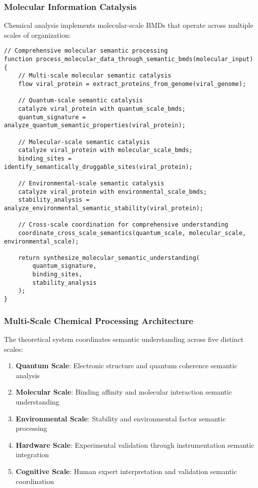 \documentclass[12pt,a4paper,twoside]{article}
\begin{document}
\subsubsection{Molecular Information Catalysis}

Chemical analysis implements molecular-scale BMDs that operate across multiple scales of organization:

\begin{lstlisting}[caption=Theoretical Cheminformatics BMD Operations]
// Comprehensive molecular semantic processing
function process_molecular_data_through_semantic_bmds(molecular_input) {
    // Multi-scale molecular semantic catalysis
    flow viral_protein = extract_proteins_from_genome(viral_genome);

    // Quantum-scale semantic catalysis
    catalyze viral_protein with quantum_scale_bmds;
    quantum_signature = analyze_quantum_semantic_properties(viral_protein);

    // Molecular-scale semantic catalysis
    catalyze viral_protein with molecular_scale_bmds;
    binding_sites = identify_semantically_druggable_sites(viral_protein);

    // Environmental-scale semantic catalysis
    catalyze viral_protein with environmental_scale_bmds;
    stability_analysis = analyze_environmental_semantic_stability(viral_protein);

    // Cross-scale coordination for comprehensive understanding
    coordinate_cross_scale_semantics(quantum_scale, molecular_scale, environmental_scale);

    return synthesize_molecular_semantic_understanding(
        quantum_signature,
        binding_sites,
        stability_analysis
    );
}
\end{lstlisting}

\subsubsection{Multi-Scale Chemical Processing Architecture}

The theoretical system coordinates semantic understanding across five distinct scales:

\begin{enumerate}
\item \textbf{Quantum Scale}: Electronic structure and quantum coherence semantic analysis
\item \textbf{Molecular Scale}: Binding affinity and molecular interaction semantic understanding
\item \textbf{Environmental Scale}: Stability and environmental factor semantic processing
\item \textbf{Hardware Scale}: Experimental validation through instrumentation semantic integration
\item \textbf{Cognitive Scale}: Human expert interpretation and validation semantic coordination
\end{enumerate}
\end{document}
